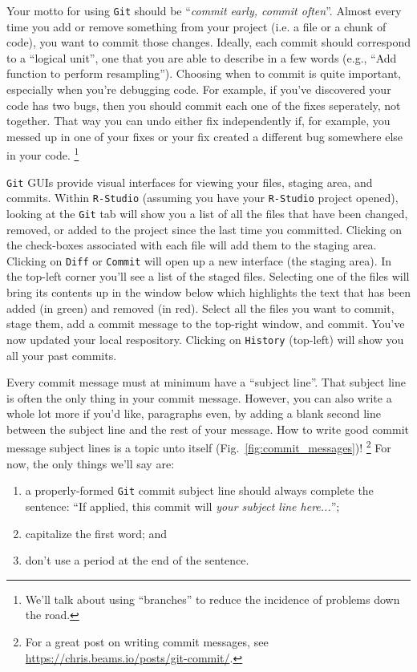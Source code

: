 \documentclass[12pt,letterpaper]{article}
\begin{document}
Your motto for using \texttt{Git} should be ``\emph{commit early, commit often}''.
Almost every time you add or remove something from your project
(i.e. a file or a chunk of code), 
you want to commit those changes.
Ideally, each commit should correspond to a ``logical unit'', 
one that you are able to describe in a few words
(e.g., ``Add function to perform resampling'').
Choosing when to commit is quite important, 
especially when you're debugging code.
For example, if you've discovered your code has two bugs, 
then you should commit each one of the fixes seperately, not together.
That way you can undo either fix independently if, for example, 
you messed up in one of your fixes or your fix created a different bug somewhere else in your code.
\unskip
\footnote{
	We'll talk about using ``branches'' to reduce the incidence of problems down the road.}

\texttt{Git} GUIs provide visual interfaces for viewing your files, 
staging area, and commits.
Within \texttt{R-Studio}
(assuming you have your \texttt{R-Studio} project opened), 
looking at the \texttt{Git} tab will show you a list of all the files that have been changed, removed, or added to the project since the last time you committed.
Clicking on the check-boxes associated with each file will add them to the staging area.
Clicking on \texttt{Diff} or \texttt{Commit} will open up a new interface (the staging area).
In the top-left corner you'll see a list of the staged files.
Selecting one of the files will bring its contents up in the window below which highlights the text that has been added (in green) and removed (in red).
Select all the files you want to commit, stage them, 
add a commit message to the top-right window, and commit.
You've now updated your local respository.
Clicking on \texttt{History} (top-left) will show you all your past commits.
  
Every commit message must at minimum have a ``subject line''.
That subject line is often the only thing in your commit message.  
However, you can also write a whole lot more if you'd like, paragraphs even, 
by adding a blank second line between the subject line and the rest of your 
message.  
How to write good commit message subject lines is a topic unto itself
(Fig.~\ref{fig:commit_messages})! 
\unskip
\footnote{
	For a great post on writing commit messages, see 
	\url{https://chris.beams.io/posts/git-commit/}.} 
For now, the only things we'll say are:
\begin{enumerate}
	\item a properly-formed \texttt{Git} commit subject line should always 
	complete the sentence:  
``If applied, this commit will \emph{your subject line here...}'';
	\item capitalize the first word; and
	\item don't use a period at the end of the sentence.	
\end{enumerate} 
\end{document}
